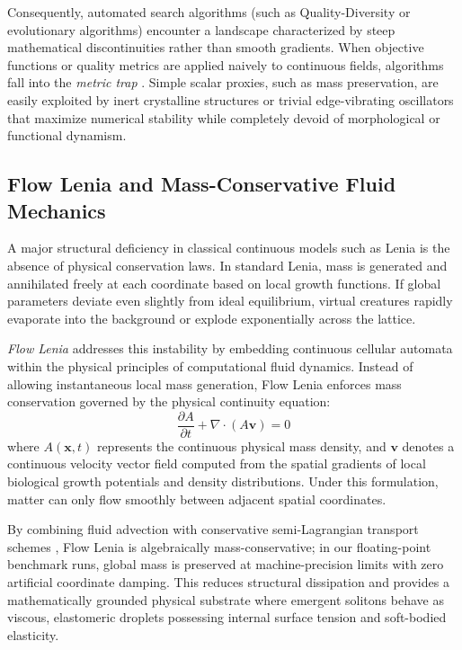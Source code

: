 Consequently, automated search algorithms (such as Quality-Diversity or evolutionary algorithms) encounter a landscape characterized by steep mathematical discontinuities rather than smooth gradients. When objective functions or quality metrics are applied naively to continuous fields, algorithms fall into the \textit{metric trap} \parencite{lehman2011novelty}. Simple scalar proxies, such as mass preservation, are easily exploited by inert crystalline structures or trivial edge-vibrating oscillators that maximize numerical stability while completely devoid of morphological or functional dynamism.

\subsection{Flow Lenia and Mass-Conservative Fluid Mechanics}
\label{subsec:intro_flow_lenia}

A major structural deficiency in classical continuous models such as Lenia is the absence of physical conservation laws. In standard Lenia, mass is generated and annihilated freely at each coordinate based on local growth functions. If global parameters deviate even slightly from ideal equilibrium, virtual creatures rapidly evaporate into the background or explode exponentially across the lattice.

\textit{Flow Lenia} \parencite{plantec2025flowlenia} addresses this instability by embedding continuous cellular automata within the physical principles of computational fluid dynamics. Instead of allowing instantaneous local mass generation, Flow Lenia enforces mass conservation governed by the physical continuity equation:
\begin{equation}
\frac{\partial A}{\partial t} + \nabla \cdot (A \mathbf{v}) = 0
\label{eq:intro_continuity}
\end{equation}
where $A(\mathbf{x}, t)$ represents the continuous physical mass density, and $\mathbf{v}$ denotes a continuous velocity vector field computed from the spatial gradients of local biological growth potentials and density distributions. Under this formulation, matter can only flow smoothly between adjacent spatial coordinates.

By combining fluid advection with conservative semi-Lagrangian transport schemes \parencite{moroz2020reintegration, plantec2025flowlenia}, Flow Lenia is algebraically mass-conservative; in our floating-point benchmark runs, global mass is preserved at machine-precision limits with zero artificial coordinate damping. This reduces structural dissipation and provides a mathematically grounded physical substrate where emergent solitons behave as viscous, elastomeric droplets possessing internal surface tension and soft-bodied elasticity.

